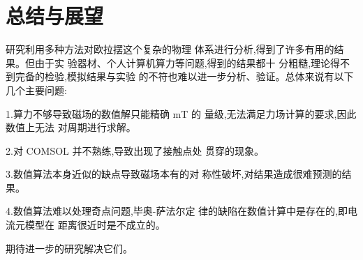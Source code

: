 \documentclass[AutoFakeBold]{LZUThesis}
\begin{document}
\chapter{总结与展望}
研究利用多种方法对欧拉摆这个复杂的物理
体系进行分析,得到了许多有用的结果。但由于实
验器材、个人计算机算力等问题,得到的结果都十
分粗糙,理论得不到完备的检验,模拟结果与实验
的不符也难以进一步分析、验证。总体来说有以下
几个主要问题:

1.算力不够导致磁场的数值解只能精确 mT 的
量级,无法满足力场计算的要求,因此数值上无法
对周期进行求解。

2.对 COMSOL 并不熟练,导致出现了接触点处
贯穿的现象。

3.数值算法本身近似的缺点导致磁场本有的对
称性破坏,对结果造成很难预测的结果。

4.数值算法难以处理奇点问题,毕奥-萨法尔定
律的缺陷在数值计算中是存在的,即电流元模型在
距离很近时是不成立的。

期待进一步的研究解决它们。
\backmatter


\printbib



\Appendix
\end{document}

